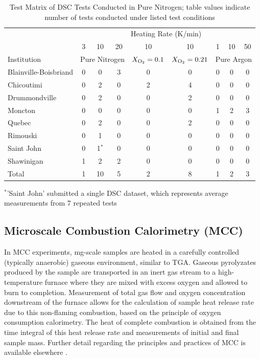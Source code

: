 \documentclass{book}
\begin{document}
\begin{table}[ht]
\caption{Test Matrix of DSC Tests Conducted in Pure Nitrogen; table values indicate number of tests conducted under listed test conditions}
\label{Table:Matrix_DSC}
\begin{center}
\begin{tabular}{lcccccccc}
							\hline
                      & \multicolumn{8}{c}{Heating Rate (K/min)} \\ 
                      & 3 & 10 & 20 & 10 & 10 & 1  & 10 & 50 \\ 
                      \hline
Institution           & \multicolumn{3}{c}{Pure Nitrogen} & $X_{\rm O_2}=0.1$ & $X_{\rm O_2}=0.21$ & \multicolumn{3}{c}{Pure Argon}  \\ \hline
Blainville-Boisbriand & 0 & 0     &     3 & 0 & 0 & 0 & 0 & 0 \\
Chicoutimi            & 0 & 2     &     0 & 2 & 4 & 0 & 0 & 0 \\
Drummondville         & 0 & 2     &     0 & 0 & 2 & 0 & 0 & 0 \\
Moncton               & 0 & 0     &     0 & 0 & 0 & 1 & 2 & 3 \\
Quebec                & 0 & 2     &     0 & 0 & 2 & 0 & 0 & 0 \\
Rimouski              & 0 & 1     &     0 & 0 & 0 & 0 & 0 & 0 \\
Saint John            & 0 & 1$^*$ &     0 & 0 & 0 & 0 & 0 & 0 \\
Shawinigan            & 1 & 2     &     2 & 0 & 0 & 0 & 0 & 0 \\ \hline
Total                 & 1 & 10    &     5 & 2 & 8 & 1 & 2 & 3 \\ \hline
\end{tabular}
\end{center}
$^*$'Saint John' submitted a single DSC dataset, which represents average measurements from 7 repeated tests
\end{table}

\subsection{Microscale Combustion Calorimetry (MCC)}

In MCC experiments, mg-scale samples are heated in a carefully controlled (typically anaerobic) gaseous environment, similar to TGA. Gaseous pyrolyzates produced by the sample are transported in an inert gas stream to a high-temperature furnace where they are mixed with excess oxygen and allowed to burn to completion. Measurement of total gas flow and oxygen concentration downstream of the furnace allows for the calculation of sample heat release rate due to this non-flaming combustion, based on the principle of oxygen consumption calorimetry. The heat of complete combustion is obtained from the time integral of this heat release rate and measurements of initial and final sample mass. Further detail regarding the principles and practices of MCC is available elsewhere \cite{lyon2013principles}.
\end{document}

